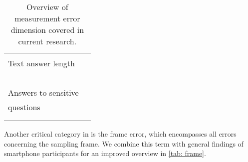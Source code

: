 \begin{table}
\begin{tabular}{ll}
    	& \cite{skeie_smartphone_2019}\\
    	Text answer length & \cite{wells_comparison_2014, mavletova_data_2013}\\
    	& \cite{antoun_effects_2017, lambert_living_2015}\\
    	& \cite{buskirk_making_2014, schlosser_mobile_2018}\\
    	& \cite{zou_mobile_2021, revilla_open_2016}\\
    	& \cite{toepoel_probing_2021, struminskaya_effects_2015}\\
    	& \cite{lugtig_use_2016, toepoel_what_2014}\\
    	Answers to sensitive & \cite{lee_experimental_2019}\\
    	questions & \cite{ mavletova_sensitive_2013}\\
    	& \cite{toninelli_smartphones_2016}\\
        & \cite{mavletova_data_2013, antoun_effects_2017}\\
    	\bottomrule
    \end{tabular}
    \caption{Overview of measurement error dimension covered in current research.}
	\label{tab: measurement}
\end{table}


Another critical category in \cite{biemer_total_2010} is the frame error, which encompasses all errors concerning the sampling frame. We combine this term with general findings of smartphone participants for an improved overview in \ref{tab: frame}.


